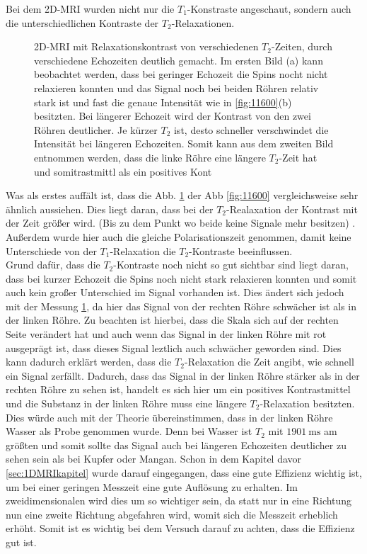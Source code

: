 Bei dem 2D-MRI wurden nicht nur die $T_1$-Konstraste angeschaut, sondern auch die unterschiedlichen Kontraste der $T_2$-Relaxationen. 

    \begin{figure}[H]
        \centering
        {}
        {}
        \caption[2D-MRI mit Relaxationskontrast von verschiedenen $T_2$-Zeiten, durch verschiedene Echozeiten]{2D-MRI mit Relaxationskontrast von verschiedenen $T_2$-Zeiten, durch verschiedene Echozeiten deutlich gemacht. Im ersten Bild (a) kann beobachtet werden, dass bei geringer Echozeit die Spins nocht nicht relaxieren konnten und das Signal noch bei beiden Röhren relativ stark ist und fast die genaue Intensität wie in \ref{fig:11600}(b) besitzten. Bei längerer Echozeit wird der Kontrast von den zwei Röhren deutlicher. Je kürzer $T_2$ ist, desto schneller verschwindet die Intensität bei längeren Echozeiten. Somit kann aus dem zweiten Bild entnommen werden, dass die linke Röhre eine längere $T_2$-Zeit hat und somitrastmittl als ein positives Kont}\label{fig:1250}
    \end{figure}
Was als erstes auffält ist, dass die Abb. \ref{fig:1250} der Abb \ref{fig:11600}  vergleichsweise sehr ähnlich aussiehen. Dies liegt daran, dass bei der $T_2$-Realaxation der Kontrast mit der Zeit größer wird. (Bis zu dem Punkt wo beide keine Signale mehr besitzen) . Außerdem wurde hier auch die gleiche Polarisationszeit genommen, damit keine Unterschiede von der $T_1$-Relaxation die $T_2$-Kontraste beeinflussen. \\
Grund dafür, dass die $T_2$-Kontraste noch nicht so gut sichtbar sind liegt daran, dass bei kurzer Echozeit die Spins noch nicht stark relaxieren konnten und somit auch kein großer Unterschied im Signal vorhanden ist. Dies ändert sich jedoch mit der Messung \ref{fig:1250}, da hier das Signal von der rechten Röhre schwächer ist als in der linken Röhre. Zu beachten ist hierbei, dass die Skala sich auf der rechten Seite verändert hat und auch wenn das Signal in der linken Röhre mit rot ausgeprägt ist, dass dieses Signal leztlich auch schwächer geworden sind. Dies kann dadurch erklärt werden, dass die $T_2$-Relaxation die Zeit angibt, wie schnell ein Signal zerfällt. Dadurch, dass das Signal in der linken Röhre stärker als in der rechten Röhre zu sehen ist, handelt es sich hier um ein positives Kontrastmittel und die Substanz in der linken Röhre muss eine längere $T_2$-Relaxation besitzten.  
Dies würde auch mit der Theorie übereinstimmen, dass in der linken Röhre Wasser als Probe genommen wurde. Denn bei Wasser ist $T_2$ mit  $\SI{1901}{\milli\second}$ am größten und somit sollte das Signal auch bei längeren Echozeiten deutlicher zu sehen sein als bei Kupfer oder Mangan.
Schon in dem Kapitel davor \ref{sec:1DMRIkapitel} wurde darauf eingegangen, dass eine gute Effizienz wichtig ist, um bei einer geringen Messzeit eine gute Auflösung zu erhalten. Im zweidimensionalen wird dies um so wichtiger sein, da statt nur in eine Richtung nun eine zweite Richtung abgefahren wird, womit sich die Messzeit erheblich erhöht. Somit ist es wichtig bei dem Versuch darauf zu achten, dass die Effizienz gut ist.